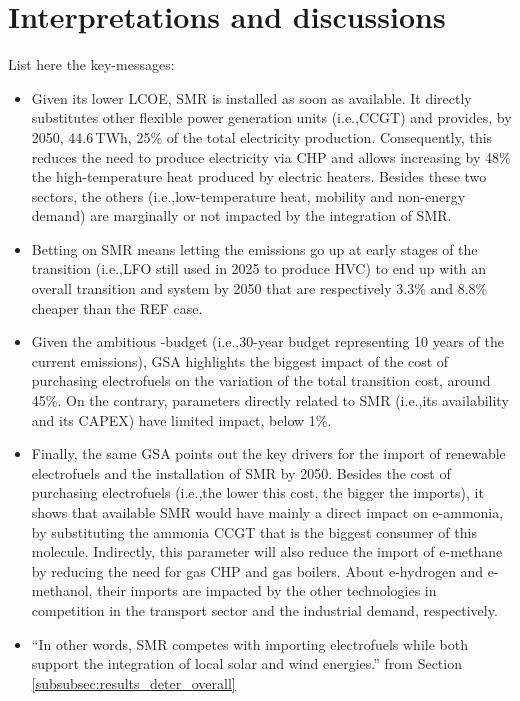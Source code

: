\documentclass[11pt,twoside,a4paper,english]{article}
\def\ie{i.e.,}
\begin{document}
\newpage
\section{Interpretations and discussions}
\label{sec:discussions}
List here the key-messages:
\begin{itemize}
\setlength\itemsep{1em}
    \item Given its lower \gls{LCOE}, \gls{SMR} is installed as soon as available. It directly substitutes other flexible power generation units (\ie CCGT) and provides, by 2050, 44.6\,TWh, 25\% of the total electricity production. Consequently, this  reduces the need to produce electricity via \gls{CHP} and allows increasing by 48\% the high-temperature heat produced by electric heaters. Besides these two sectors, the others (\ie low-temperature heat, mobility and non-energy demand) are marginally or not impacted by the integration of \gls{SMR}.
    \item Betting on \gls{SMR} means letting the emissions go up at early stages of the transition (\ie \gls{LFO} still used in 2025 to produce \gls{HVC}) to end up with an overall transition and system by 2050 that are respectively 3.3\% and 8.8\% cheaper than the REF case. 
    \item Given the ambitious -budget (\ie 30-year budget representing 10 years of the current emissions), \acrfull{GSA} highlights the biggest impact of the cost of purchasing electrofuels on the variation of the total transition cost, around 45\%. On the contrary, parameters directly related to \gls{SMR} (\ie its availability and its CAPEX) have limited impact, below 1\%.
    \item Finally, the same \gls{GSA} points out the key drivers for the import of renewable electrofuels and the installation of \gls{SMR} by 2050. Besides the cost of purchasing electrofuels (\ie the lower this cost, the bigger the imports), it shows that available \gls{SMR} would have mainly a direct impact on e-ammonia, by substituting the ammonia \gls{CCGT} that is the biggest consumer of this molecule. Indirectly, this parameter will also reduce the import of e-methane by reducing the need for gas \gls{CHP} and gas boilers. About e-hydrogen and e-methanol, their imports are impacted by the other technologies in competition in the transport sector and the industrial demand, respectively.
    \item ``In other words, \gls{SMR} competes with importing electrofuels while both support the integration of local solar and wind energies.'' from Section \ref{subsubsec:results_deter_overall}
\end{itemize}
\end{document}
